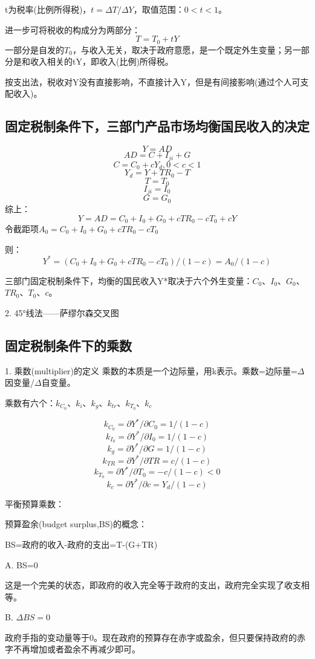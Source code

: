 \documentclass{article}
\begin{document}
t为税率(比例所得税)，$ t=\Delta T/\Delta Y $，取值范围：$ 0<t<1 $。

进一步可将税收的构成分为两部分：
\[
T=T_0+tY
\]
一部分是自发的$ T_0 $，与收入无关，取决于政府意愿，是一个既定外生变量；另一部分是和收入相关的tY，即收入(比例)所得税。

按支出法，税收对Y没有直接影响，不直接计入Y，但是有间接影响(通过个人可支配收入)。

\subsection{固定税制条件下，三部门产品市场均衡国民收入的决定}
\[
Y=AD
\]
\[
AD=C+I_{ji}+G
\]
\[
C=C_0+cY_d,0<c<1
\]
\[
Y_d=Y+TR_0-T
\]
\[
T=T_0
\]
\[
I_{ji}=I_0
\]
\[
G=G_0
\]
综上：
\[
Y=AD=C_0+I_0+G_0+cTR_0-cT_0+cY
\]
令截距项$ A_0=C_0+I_0+G_0+cTR_0-cT_0 $

则：
\[
Y^*=(C_0+I_0+G_0+cTR_0-cT_0)/(1-c)=A_0/(1-c)
\]

三部门固定税制条件下，均衡的国民收入Y*取决于六个外生变量：$ C_0 $、$ I_0 $、$ G_0 $、$ TR_0 $、$ T_0 $、$ c $。

\hspace*{\fill}

2. 45°线法——萨缪尔森交叉图

\subsection{固定税制条件下的乘数}
1. 乘数(multiplier)的定义
乘数的本质是一个边际量，用k表示。乘数=边际量=$ \Delta $因变量/$ \Delta $自变量。

乘数有六个：$ k_{C_0} $、$ k_i $、$ k_g $、$ k_{tr} $、$ k_{T_0} $、$ k_c $

\[ k_{C_0}=\partial Y^*/\partial C_0=1/(1-c) \]
\[ k_{I_0}=\partial Y^*/\partial I_0=1/(1-c) \]
\[ k_g=\partial Y^*/\partial G=1/(1-c) \]
\[ k_{TR}=\partial Y^*/\partial TR=c/(1-c) \]
\[ k_{T_0}=\partial Y^*/\partial T_0=-c/(1-c)<0 \]
\[ k_c=\partial Y^*/\partial c=Y_d/(1-c) \]

平衡预算乘数：

预算盈余(budget surplus,BS)的概念：

BS=政府的收入-政府的支出=T-(G+TR)

A. BS=0

这是一个完美的状态，即政府的收入完全等于政府的支出，政府完全实现了收支相等。

B. $ \Delta BS=0 $

政府手指的变动量等于0。现在政府的预算存在赤字或盈余，但只要保持政府的赤字不再增加或者盈余不再减少即可。
\end{document}
